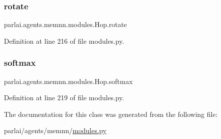 \subsubsection{\texorpdfstring{rotate}{rotate}}
{\footnotesize\ttfamily parlai.\+agents.\+memnn.\+modules.\+Hop.\+rotate}



Definition at line 216 of file modules.\+py.

\mbox{\label{classparlai_1_1agents_1_1memnn_1_1modules_1_1Hop_a50d4a5a4bd188efc2944d68c0761cc0a}} 
\subsubsection{\texorpdfstring{softmax}{softmax}}
{\footnotesize\ttfamily parlai.\+agents.\+memnn.\+modules.\+Hop.\+softmax}



Definition at line 219 of file modules.\+py.



The documentation for this class was generated from the following file\+:\begin{DoxyCompactItemize}
\item 
parlai/agents/memnn/\hyperlink{parlai_2agents_2memnn_2modules_8py}{modules.\+py}\end{DoxyCompactItemize}
